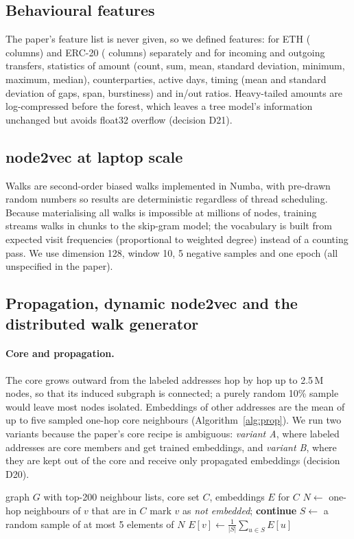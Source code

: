 \subsection{Behavioural features}
The paper's feature list is never given, so we defined \NumFeat{} features: for ETH (\NumFeatEth{} columns) and ERC-20 (\NumFeatErc{} columns) separately and for incoming and outgoing transfers, statistics of amount (count, sum, mean, standard deviation, minimum, maximum, median), counterparties, active days, timing (mean and standard deviation of gaps, span, burstiness) and in/out ratios. Heavy-tailed amounts are log-compressed before the forest, which leaves a tree model's information unchanged but avoids float32 overflow (decision D21).

\subsection{node2vec at laptop scale}
Walks are second-order biased walks implemented in Numba, with pre-drawn random numbers so results are deterministic regardless of thread scheduling. Because materialising all walks is impossible at millions of nodes, training streams walks in chunks to the skip-gram model; the vocabulary is built from expected visit frequencies (proportional to weighted degree) instead of a counting pass. We use dimension 128, window 10, 5 negative samples and one epoch (all unspecified in the paper).

\subsection{Propagation, dynamic node2vec and the distributed walk generator}
\paragraph{Core and propagation.} The core grows outward from the labeled addresses hop by hop up to 2.5\,M nodes, so that its induced subgraph is connected; a purely random 10\% sample would leave most nodes isolated. Embeddings of other addresses are the mean of up to five sampled one-hop core neighbours (Algorithm~\ref{alg:prop}). We run two variants because the paper's core recipe is ambiguous: \emph{variant A}, where labeled addresses are core members and get trained embeddings, and \emph{variant B}, where they are kept out of the core and receive only propagated embeddings (decision D20).

\begin{algorithm}[H]
\caption{Embedding propagation}\label{alg:prop}
\small\singlespacing
\begin{algorithmic}[1]
\Require graph $G$ with top-200 neighbour lists, core set $C$, embeddings $E$ for $C$
  \State $N \gets$ one-hop neighbours of $v$ that are in $C$
   \State mark $v$ as \emph{not embedded}; \textbf{continue} \EndIf
  \State $S \gets$ a random sample of at most 5 elements of $N$
  \State $E[v] \gets \frac{1}{|S|}\sum_{u\in S}E[u]$
\EndFor
\end{algorithmic}
\end{algorithm}

